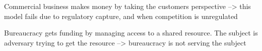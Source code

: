 Commercial business makes money by taking the customers perspective
--> this model fails due to regulatory capture, and when competition is unregulated 

Bureaucracy gets funding by managing access to a shared resource. The subject is adversary trying to get the resource
--> bureaucracy is not serving the subject 

